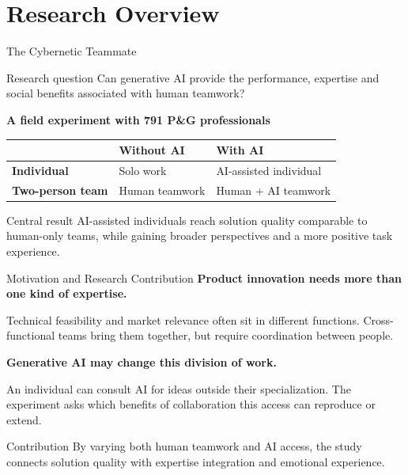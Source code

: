 \section{Research Overview}
\begin{frame}[t]{The Cybernetic Teammate}
\small
\begin{block}{Research question}
Can generative AI provide the performance, expertise and social benefits associated with human teamwork?
\end{block}

\vspace{0.28cm}
\centering
\textcolor{paperred}{\bfseries A field experiment with 791 P\&G professionals}\par\smallskip
\renewcommand{\arraystretch}{1.45}
\begin{tabularx}{0.84\linewidth}{@{}>{\bfseries}lXX@{}}
& \centering\arraybackslash Without AI & \centering\arraybackslash With AI \\
\midrule
Individual & \centering\arraybackslash Solo work & \centering\arraybackslash AI-assisted individual \\
Two-person team & \centering\arraybackslash Human teamwork & \centering\arraybackslash Human + AI teamwork \\
\bottomrule
\end{tabularx}

\vspace{0.34cm}
\begin{alertblock}{Central result}
AI-assisted individuals reach solution quality comparable to human-only teams, while gaining broader perspectives and a more positive task experience.
\end{alertblock}
\end{frame}

\begin{frame}[t]{Motivation and Research Contribution}
\small
\textcolor{paperred}{\bfseries Product innovation needs more than one kind of expertise.}\par\medskip
Technical feasibility and market relevance often sit in different functions. Cross-functional teams bring them together, but require coordination between people.

\vspace{0.48cm}
\textcolor{paperred}{\bfseries Generative AI may change this division of work.}\par\medskip
An individual can consult AI for ideas outside their specialization. The experiment asks which benefits of collaboration this access can reproduce or extend.

\vspace{0.50cm}
\begin{alertblock}{Contribution}
By varying both human teamwork and AI access, the study connects solution quality with expertise integration and emotional experience.
\end{alertblock}
\end{frame}

